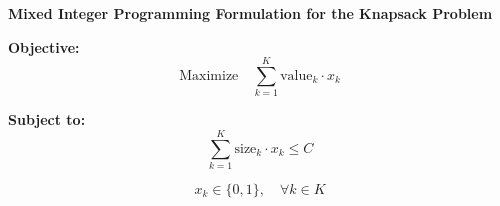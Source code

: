 \documentclass{article}
\begin{document}
\textbf{Mixed Integer Programming Formulation for the Knapsack Problem}

\textbf{Objective:}
\[
\text{Maximize} \quad \sum_{k=1}^{K} \text{value}_k \cdot x_k
\]

\textbf{Subject to:}
\[
\sum_{k=1}^{K} \text{size}_k \cdot x_k \leq C
\]

\[
x_k \in \{0, 1\}, \quad \forall k \in K
\]
\end{document}
